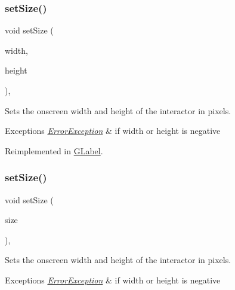 \subsubsection{\texorpdfstring{set\+Size()}{setSize()}\hspace{0.1cm}{\footnotesize\ttfamily [1/2]}}
{\footnotesize\ttfamily void set\+Size (\begin{DoxyParamCaption}\item[{double}]{width,  }\item[{double}]{height }\end{DoxyParamCaption})\hspace{0.3cm}{\ttfamily [virtual]}, {\ttfamily [inherited]}}



Sets the onscreen width and height of the interactor in pixels. 


\begin{DoxyExceptions}{Exceptions}
{\em \mbox{\hyperlink{classErrorException}{Error\+Exception}}} & if width or height is negative \\
\hline
\end{DoxyExceptions}


Reimplemented in \mbox{\hyperlink{classGLabel_ae7e6371aa2311d6f18caf8f7be59704d}{G\+Label}}.

\mbox{\label{classGInteractor_ae2b628228f192c2702c4ce941b2af68f}} 
\subsubsection{\texorpdfstring{set\+Size()}{setSize()}\hspace{0.1cm}{\footnotesize\ttfamily [2/2]}}
{\footnotesize\ttfamily void set\+Size (\begin{DoxyParamCaption}\item[{const \mbox{\hyperlink{classGDimension}{G\+Dimension}} \&}]{size }\end{DoxyParamCaption})\hspace{0.3cm}{\ttfamily [virtual]}, {\ttfamily [inherited]}}



Sets the onscreen width and height of the interactor in pixels. 


\begin{DoxyExceptions}{Exceptions}
{\em \mbox{\hyperlink{classErrorException}{Error\+Exception}}} & if width or height is negative \\
\hline
\end{DoxyExceptions}


